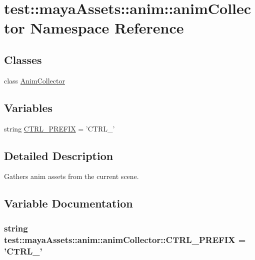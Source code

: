 \hypertarget{namespacetest_1_1mayaAssets_1_1anim_1_1animCollector}{\section{test\-:\-:maya\-Assets\-:\-:anim\-:\-:anim\-Collector \-Namespace \-Reference}
\label{df/d43/namespacetest_1_1mayaAssets_1_1anim_1_1animCollector}
}
\subsection*{\-Classes}
\begin{DoxyCompactItemize}
\item 
class \hyperlink{classtest_1_1mayaAssets_1_1anim_1_1animCollector_1_1AnimCollector}{\-Anim\-Collector}
\end{DoxyCompactItemize}
\subsection*{\-Variables}
\begin{DoxyCompactItemize}
\item 
string \hyperlink{namespacetest_1_1mayaAssets_1_1anim_1_1animCollector_a2dd8942a4b782a95f9f450d2c3ed7dc1}{\-C\-T\-R\-L\-\_\-\-P\-R\-E\-F\-I\-X} = '\-C\-T\-R\-L\-\_\-'
\end{DoxyCompactItemize}


\subsection{\-Detailed \-Description}
\begin{DoxyVerb}
Gathers anim assets from the current scene.
\end{DoxyVerb}
 

\subsection{\-Variable \-Documentation}
\hypertarget{namespacetest_1_1mayaAssets_1_1anim_1_1animCollector_a2dd8942a4b782a95f9f450d2c3ed7dc1}{
\subsubsection[{\-C\-T\-R\-L\-\_\-\-P\-R\-E\-F\-I\-X}]{\setlength{\rightskip}{0pt plus 5cm}string {\bf test\-::maya\-Assets\-::anim\-::anim\-Collector\-::\-C\-T\-R\-L\-\_\-\-P\-R\-E\-F\-I\-X} = '\-C\-T\-R\-L\-\_\-'}}\label{df/d43/namespacetest_1_1mayaAssets_1_1anim_1_1animCollector_a2dd8942a4b782a95f9f450d2c3ed7dc1}
